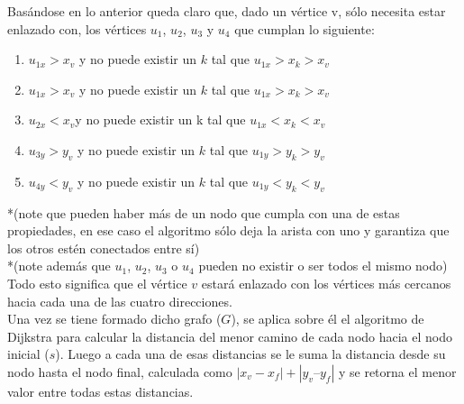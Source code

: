 \documentclass[a4paper,12pt,twocolumn]{article}
\begin{document}
		Basándose en lo anterior queda claro que, dado un vértice v, sólo necesita estar enlazado con, los vértices $u_1$, $u_2$, $u_3$ y $u_4$ que cumplan lo siguiente:
		\begin{enumerate}
		\item 	$u_{1x} > x_v$ y no puede existir un $k$ tal que $u_{1x} > x_k > x_v$
		\item $u_{1x} > x_v$ y no puede existir un $k$ tal que $u_{1x} > x_k > x_v$
		\item $u_{2x} < x_v $y no puede existir un k tal que $u_{1x} < x_k < x_v$
		\item $u_{3y} > y_v$ y no puede existir un $k$ tal que ${u_{1y}} > y_k > y_v$
		\item $u_{4y} < y_v$ y no puede existir un $k$ tal que $u_{1y} < y_k < y_v$
		\end{enumerate}
		*(note que pueden haber más de un nodo que cumpla con una de estas propiedades, en ese caso el algoritmo sólo deja la arista con uno y garantiza que los otros estén conectados entre sí)\\
		*(note además que $u_1$, $u_2$, $u_3$ o $u_4$ pueden no existir o ser todos el mismo nodo)\\
		Todo esto significa que el vértice $v$ estará enlazado con los vértices más cercanos hacia cada una de las cuatro direcciones.\\
			
		Una vez se tiene formado dicho grafo ($G$), se aplica sobre él el algoritmo de Dijkstra para calcular la distancia del menor camino de cada nodo hacia el nodo inicial ($s$). Luego a cada una de esas distancias se le suma la distancia desde su nodo hasta el nodo final, calculada como $| x_v - x_f| + | y_v – y_f|$ y se retorna el menor valor entre todas estas distancias.\\
		
\end{document}
